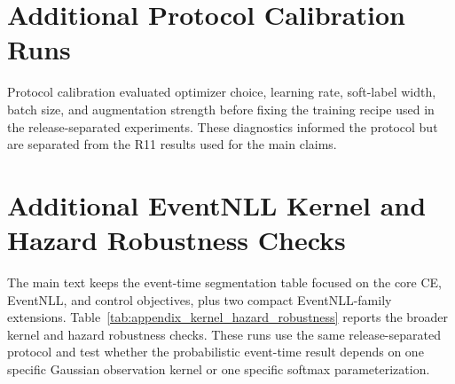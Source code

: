 \documentclass[12pt]{article}
\begin{document}
\begin{table}[!t]
\centering
\caption{Unwrapped external-backbone sanity checks. ``Wrapped'' means that the model receives the same per-window channel standardization used by our compact baselines. Lower nRMSE is better. These checks diagnose scale sensitivity; the wrapped variants are the fair external comparisons used in the main results.}
\label{tab:appendix_unwrapped_external}
\scriptsize
\setlength{\tabcolsep}{3pt}
\renewcommand{\arraystretch}{1.12}
\end{table}

\section{Additional Protocol Calibration Runs}

Protocol calibration evaluated optimizer choice, learning rate, soft-label width, batch size, and augmentation strength before fixing the training recipe used in the release-separated experiments. These diagnostics informed the protocol but are separated from the R11 results used for the main claims.

\section{Additional EventNLL Kernel and Hazard Robustness Checks}

The main text keeps the event-time segmentation table focused on the core CE, EventNLL, and control objectives, plus two compact EventNLL-family extensions. Table~\ref{tab:appendix_kernel_hazard_robustness} reports the broader kernel and hazard robustness checks. These runs use the same release-separated protocol and test whether the probabilistic event-time result depends on one specific Gaussian observation kernel or one specific softmax parameterization.
\end{document}
